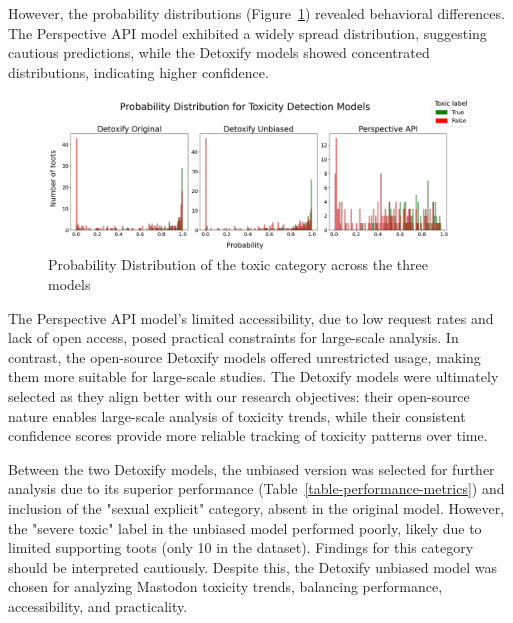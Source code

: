 However, the probability distributions (Figure~\ref{probability-distribution}) revealed behavioral differences. The Perspective API model exhibited a widely spread distribution, suggesting cautious predictions, while the Detoxify models showed concentrated distributions, indicating higher confidence.

\begin{figure}[tb]
    \centering
    \includegraphics[width=\textwidth]{../material/probability_distribution.png}
    \caption{Probability Distribution of the toxic category across the three models}
    \label{probability-distribution}
\end{figure}

The Perspective API model's limited accessibility, due to low request rates and lack of open access, posed practical constraints for large-scale analysis. In contrast, the open-source Detoxify models offered unrestricted usage, making them more suitable for large-scale studies. The Detoxify models were ultimately selected as they align better with our research objectives: their open-source nature enables large-scale analysis of toxicity trends, while their consistent confidence scores provide more reliable tracking of toxicity patterns over time.

Between the two Detoxify models, the unbiased version was selected for further analysis due to its superior performance (Table~\ref{table-performance-metrics}) and inclusion of the "sexual explicit" category, absent in the original model. However, the "severe toxic" label in the unbiased model performed poorly, likely due to limited supporting toots (only 10 in the dataset). Findings for this category should be interpreted cautiously. Despite this, the Detoxify unbiased model was chosen for analyzing Mastodon toxicity trends, balancing performance, accessibility, and practicality.

